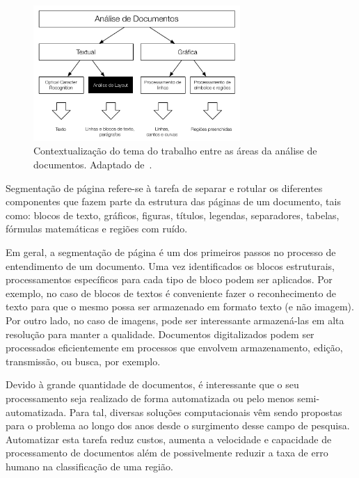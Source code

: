 \documentclass[a4paper,11pt]{article}
\begin{document}
\begin{figure}[htb]
\begin{center}
\includegraphics[width=0.7\textwidth]{assets/document_processing_areas_hierarquies.pdf}
\end{center}
\caption{Contextualização do tema do trabalho entre as áreas da
  análise de documentos. Adaptado de~\cite{Kasturi_OGorman_Govindaraju_2002}.}
\label{fig:context1}
\end{figure}

Segmentação de página refere-se à tarefa de separar e rotular os diferentes
componentes que fazem parte da estrutura das páginas de um
documento, tais como: blocos de texto, gráficos, figuras, títulos,
legendas, separadores, tabelas, fórmulas matemáticas e regiões com
ruído.

Em geral, a segmentação de página é um dos primeiros passos no
processo de entendimento de um documento. Uma vez identificados os
blocos estruturais, processamentos específicos para cada tipo de bloco
podem ser aplicados. Por exemplo, no caso de blocos de textos é
conveniente fazer o reconhecimento de texto para que o mesmo possa ser
armazenado em formato texto (e não imagem). Por outro lado, no caso de
imagens, pode ser interessante armazená-las em alta resolução para
manter a qualidade. Documentos digitalizados podem ser processados
eficientemente em processos que envolvem armazenamento, edição,
transmissão, ou busca, por exemplo.

Devido à grande quantidade de documentos, é interessante que o seu
processamento seja realizado de forma automatizada ou pelo menos
semi-automatizada. Para tal, diversas soluções computacionais vêm
sendo propostas para o problema ao longo dos anos desde o surgimento
desse campo de pesquisa. Automatizar esta tarefa reduz custos, aumenta
a velocidade e capacidade de processamento de documentos além de
possivelmente reduzir a taxa de erro humano na classificação de uma
região.
\end{document}
